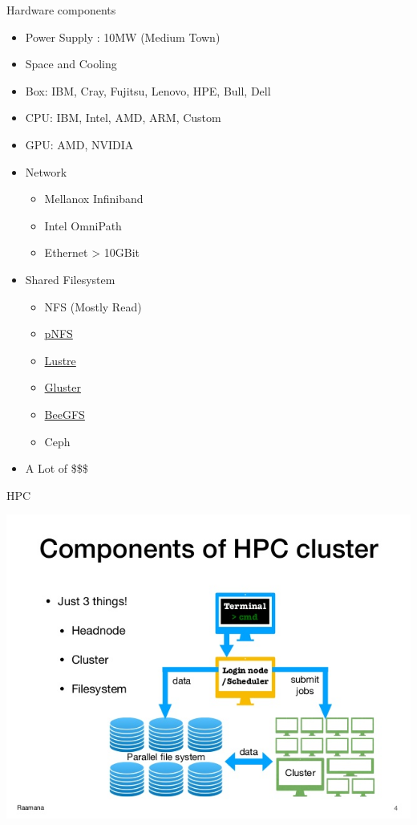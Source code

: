 \documentclass[ignorenonframetext,]{beamer}
\providecommand{\tightlist}{%
  \setlength{\itemsep}{0pt}\setlength{\parskip}{0pt}}
\begin{document}
\begin{frame}{Hardware components}

\begin{itemize}
\tightlist
\item
  Power Supply : 10MW (Medium Town)
\item
  Space and Cooling
\item
  Box: IBM, Cray, Fujitsu, Lenovo, HPE, Bull, Dell
\item
  CPU: IBM, Intel, AMD, ARM, Custom
\item
  GPU: AMD, NVIDIA
\item
  Network

  \begin{itemize}
  \tightlist
  \item
    Mellanox Infiniband
  \item
    Intel OmniPath
  \item
    Ethernet \textgreater{} 10GBit
  \end{itemize}

\item
  Shared Filesystem

  \begin{itemize}
  \tightlist
  \item
    NFS (Mostly Read)
  \item
    \href{http://www.pnfs.com/}{pNFS}
  \item
    \href{http://lustre.org/}{Lustre}
  \item
    \href{https://www.gluster.org/}{Gluster}
  \item
    \href{https://www.beegfs.io/content/}{BeeGFS}
  \item
    Ceph
  \end{itemize}

\item
  A Lot of \$\$\$
\end{itemize}


\end{frame}

\begin{frame}{HPC}

\includegraphics{images/hpc-components.jpg}

\end{frame}
\end{document}
